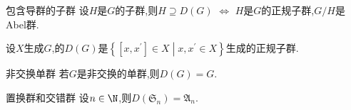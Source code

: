 \begin{corollary}{包含导群的子群}{}
	设$H$是$G$的子群,则$H\supseteq D\left(G\right)$ $\iff$ $H$是$G$的正规子群,$G/H$是Abel群.
\end{corollary}

\begin{corollary}{}{}
	设$X$生成$G$,的$D\left(G\right)$是$\left\{\left[x,x^{\prime}\right]\in X\middle|x,x^{\prime}\in X\right\}$生成的正规子群.
\end{corollary}

\begin{example}{非交换单群}{}
	若$G$是非交换的单群,则$D\left(G\right)=G$.
\end{example}

\begin{example}{置换群和交错群}{}
	设$n\in\N$,则$D\left(\mathfrak{S}_{n}\right)=\mathfrak{A}_{n}$.
\end{example}





































